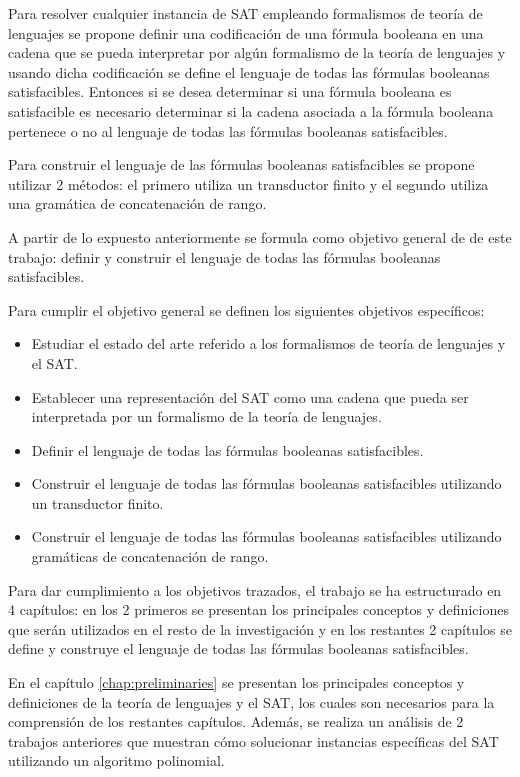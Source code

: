 \documentclass[12pt]{article}
\begin{document}
Para resolver cualquier instancia de SAT empleando formalismos de teoría de lenguajes se propone definir una codificación
de una fórmula booleana en una cadena que se pueda interpretar por algún formalismo de la teoría de lenguajes
y usando dicha codificación se define el lenguaje de todas las fórmulas booleanas satisfacibles. Entonces si se desea
determinar si una fórmula booleana es satisfacible es necesario determinar si la cadena asociada a la  fórmula booleana pertenece o no al lenguaje de todas las fórmulas booleanas satisfacibles.

Para construir el lenguaje
de las fórmulas booleanas satisfacibles se propone utilizar 2 métodos: el primero utiliza un transductor finito y el segundo
utiliza una gramática de concatenación de rango.

A partir de lo expuesto anteriormente se formula como objetivo general de de este trabajo: definir y construir el lenguaje de todas las fórmulas booleanas satisfacibles.

Para cumplir el objetivo general se definen los siguientes objetivos específicos:

\begin{itemize}
      \item Estudiar el estado del arte referido a los formalismos de teoría de lenguajes y el SAT.
      \item Establecer una representación del SAT como una cadena que pueda ser interpretada por un formalismo de la teoría de lenguajes.
      \item Definir el lenguaje de todas las fórmulas booleanas satisfacibles.
      \item Construir el lenguaje de todas las fórmulas booleanas satisfacibles utilizando un transductor finito.
      \item Construir el lenguaje de todas las fórmulas booleanas satisfacibles utilizando gramáticas de concatenación de rango.
\end{itemize}

Para dar cumplimiento a los objetivos trazados, el trabajo se ha estructurado en 4 capítulos: en los 2 primeros se presentan los principales conceptos y definiciones
que serán utilizados en el resto de la investigación y en los restantes 2 capítulos se define y construye el lenguaje de todas las fórmulas booleanas satisfacibles.

En el capítulo \ref{chap:preliminaries} se presentan los principales conceptos y definiciones de la teoría de lenguajes y el SAT, los cuales
son necesarios para la comprensión de los restantes capítulos. Además, se realiza un análisis de 2 trabajos anteriores
que muestran cómo solucionar instancias específicas del SAT utilizando un algoritmo polinomial.
\end{document}
